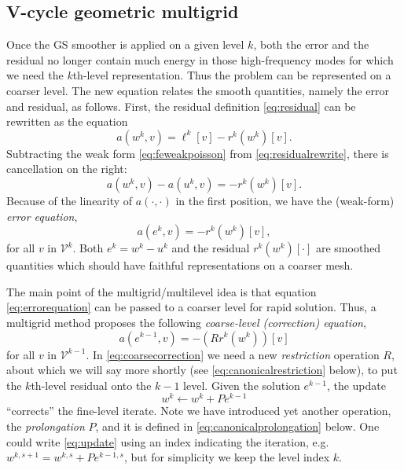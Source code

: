 \documentclass[letterpaper,final,12pt,reqno]{amsart}
\numberwithin{equation}{section}
\numberwithin{figure}{section}
\numberwithin{table}{section}
\begin{document}
\subsection*{V-cycle geometric multigrid}  Once the GS smoother is applied on a given level $k$, both the error and the residual no longer contain much energy in those high-frequency modes for which we need the $k$th-level representation.  Thus the problem can be represented on a coarser level.  The new equation relates the smooth quantities, namely the error and residual, as follows.  First, the residual definition \eqref{eq:residual} can be rewritten as the equation
\begin{equation}
  a(w^k,v) = \ell^k[v] - r^k(w^k)[v].  \label{eq:residualrewrite}
\end{equation}
Subtracting the weak form \eqref{eq:feweakpoisson} from \eqref{eq:residualrewrite}, there is cancellation on the right:
\begin{equation}
  a(w^k,v) - a(u^k,v) = - r^k(w^k)[v].  \label{eq:errorequationearly}
\end{equation}
Because of the linearity of $a(\cdot,\cdot)$ in the first position, we have the (weak-form) \emph{error equation},
\begin{equation}
  a(e^k,v) = - r^k(w^k)[v],  \label{eq:errorequation}
\end{equation}
for all $v$ in $\mathcal{V}^k$.  Both $e^k=w^k-u^k$ and the residual $r^k(w^k)[\cdot]$ are smoothed quantities which should have faithful representations on a coarser mesh.

The main point of the multigrid/multilevel idea is that equation \eqref{eq:errorequation} can be passed to a coarser level for rapid solution.  Thus, a multigrid method proposes the following \emph{coarse-level (correction) equation},
\begin{equation}
  a(e^{k-1},v) = - (Rr^k(w^k))[v]  \label{eq:coarsecorrection}
\end{equation}
for all $v$ in $\mathcal{V}^{k-1}$.  In \eqref{eq:coarsecorrection} we need a new \emph{restriction} operation $R$, about which we will say more shortly (see \eqref{eq:canonicalrestriction} below), to put the $k$th-level residual onto the $k-1$ level.  Given the solution $e^{k-1}$, the update
\begin{equation}
  w^k \gets w^k + P e^{k-1}  \label{eq:update}
\end{equation}
``corrects'' the fine-level iterate.  Note we have introduced yet another operation, the \emph{prolongation} $P$, and it is defined in \eqref{eq:canonicalprolongation} below.  One could write \eqref{eq:update} using an index indicating the iteration, e.g.~$w^{k,s+1} = w^{k,s} + Pe^{k-1,s}$, but for simplicity we keep the level index $k$.
\end{document}

